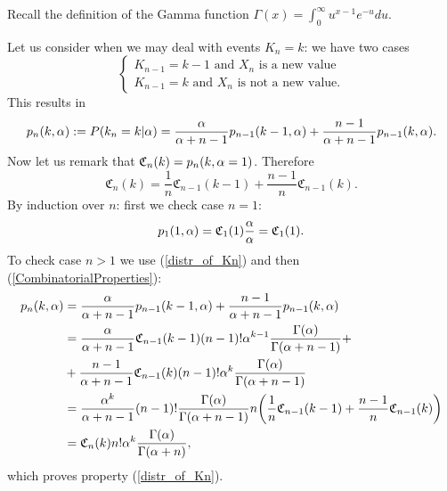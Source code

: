  Recall the definition of the \alert{Gamma function} $\Gamma(x)=\int_0^\infty u^{x-1}e^{-u}du$.
 




Let us consider when we may deal with events $K_n = k$: we have two cases
\begin{equation*}
    \left \{ \begin{matrix}
K_{n-1}=k-1 \text{ and } X_n \text{ is a new value}\\
K_{n-1} = k \text{ and } X_n \text{ is not a new value}.
\end{matrix}\right.
\end{equation*}
 This results in
\begin{equation}\label{CombinatorialProperties}
    p_n(k,\alpha) := P(k_n = k|\alpha) = \frac{\alpha}{\alpha +n -1 }p_{n-1} (k-1,\alpha)+\frac{n-1}{\alpha +n -1}p_{n-1}(k,\alpha).
\end{equation}
Now let us remark that $\mathfrak{C}_n(k)=p_n(k,\alpha =1)$. Therefore
\begin{equation}\label{mathfrakC_property}
    \mathfrak{C}_n(k)=\frac 1n \mathfrak{C}_{n-1}(k-1)+\frac{n-1}{n}\mathfrak{C}_{n-1}(k).
\end{equation}
By induction over $n$: first we check case $n=1$:
\begin{equation*}
    p_1(1,\alpha)=\mathfrak{C}_1(1)\frac{\alpha}{\alpha}=\mathfrak{C}_1(1).
\end{equation*}
To check case $n>1$ we use (\ref{distr_of_Kn}) and then (\ref{CombinatorialProperties}):
\begin{equation*}
    \begin{split}
        p_n(k,\alpha)&=\frac{\alpha}{\alpha +n -1 }p_{n-1} (k-1,\alpha)+\frac{n-1}{\alpha +n -1}p_{n-1}(k,\alpha) \\
        &=\frac{\alpha}{\alpha +n -1 }\mathfrak{C}_{n-1}(k-1)(n-1)!\alpha^{k-1}\frac{\Gamma (\alpha)}{\Gamma(\alpha+n-1)} +\\
        &+\frac{n-1}{\alpha +n -1}\mathfrak{C}_{n-1}(k)(n-1)!\alpha^{k}\frac{\Gamma (\alpha)}{\Gamma(\alpha+n-1)}\\
        &=\frac{\alpha^k}{\alpha+n-1}(n-1)!\frac{\Gamma(\alpha)}{ \Gamma(\alpha+n-1) }n\bigg(\frac 1n \mathfrak{C}_{n-1}(k-1) + \frac{n-1}{n} \mathfrak{C}_{n-1}(k)\bigg)\\
        &=\mathfrak{C}_{n}(k)n!\alpha^k\frac{\Gamma(\alpha)}{\Gamma(\alpha+n)},
    \end{split}
\end{equation*}
which proves property (\ref{distr_of_Kn}).

